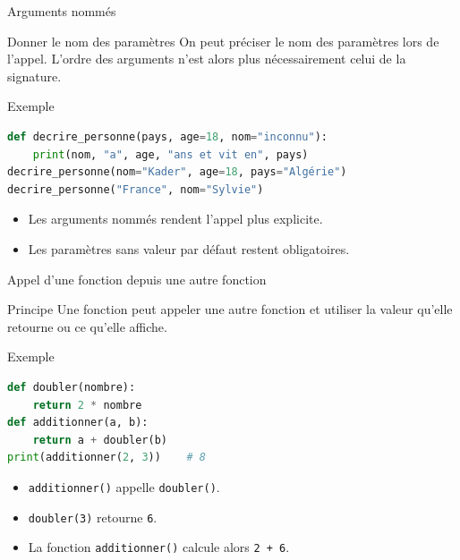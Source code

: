 \documentclass[10pt, xcolor={svgnames}]{beamer}
\begin{document}
\begin{frame}[fragile]{Arguments nommés}
	
	\begin{block}{Donner le nom des paramètres}
		On peut préciser le nom des paramètres lors de l'appel.
		L'ordre des arguments n'est alors plus nécessairement celui
		de la signature.
	\end{block}
	
	\vspace{0.3cm}
	
	\begin{exampleblock}{Exemple}
		\begin{lstlisting}[language=Python]
def decrire_personne(pays, age=18, nom="inconnu"):
	print(nom, "a", age, "ans et vit en", pays)
decrire_personne(nom="Kader", age=18, pays="Algérie")
decrire_personne("France", nom="Sylvie")
		\end{lstlisting}
	\end{exampleblock}
	
	\vspace{0.2cm}
	
	\begin{itemize}
		\item Les arguments nommés rendent l'appel plus explicite.
		\item Les paramètres sans valeur par défaut restent obligatoires.
	\end{itemize}
	
\end{frame}


\begin{frame}[fragile]{Appel d'une fonction depuis une autre fonction}
	
	\begin{block}{Principe}
		Une fonction peut appeler une autre fonction et utiliser
		la valeur qu'elle retourne ou ce qu'elle affiche.
	\end{block}
	
	\vspace{0.4cm}
	
	\begin{exampleblock}{Exemple}
		\begin{lstlisting}[language=Python]
def doubler(nombre):
	return 2 * nombre
def additionner(a, b):
	return a + doubler(b)
print(additionner(2, 3))    # 8
		\end{lstlisting}
	\end{exampleblock}
	
	\vspace{0.3cm}
	
	\begin{itemize}
		\item \texttt{additionner()} appelle \texttt{doubler()}.
		\item \texttt{doubler(3)} retourne \texttt{6}.
		\item La fonction \texttt{additionner()} calcule alors \texttt{2 + 6}.
	\end{itemize}
	
\end{frame}
\end{document}
